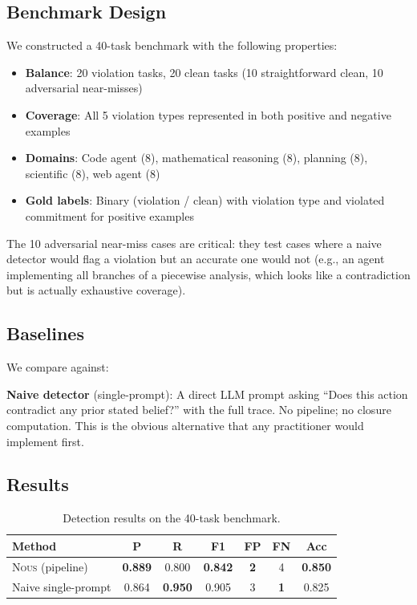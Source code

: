 \documentclass[11pt]{article}
\newcommand{\nous}{\textsc{Nous}} %
\begin{document}
\subsection{Benchmark Design}
\label{sec:benchmark}

We constructed a 40-task benchmark with the following properties:

\begin{itemize}
  \item \textbf{Balance}: 20 violation tasks, 20 clean tasks
    (10 straightforward clean, 10 adversarial near-misses)
  \item \textbf{Coverage}: All 5 violation types represented in both
    positive and negative examples
  \item \textbf{Domains}: Code agent (8), mathematical reasoning (8),
    planning (8), scientific (8), web agent (8)
  \item \textbf{Gold labels}: Binary (violation / clean) with violation type
    and violated commitment for positive examples
\end{itemize}

The 10 adversarial near-miss cases are critical: they test cases where
a naive detector would flag a violation but an accurate one would not
(e.g., an agent implementing all branches of a piecewise analysis,
which looks like a contradiction but is actually exhaustive coverage).

\subsection{Baselines}
\label{sec:baselines}

We compare against:

\textbf{Naive detector} (single-prompt): A direct LLM prompt asking
``Does this action contradict any prior stated belief?'' with the full
trace. No pipeline; no closure computation. This is the obvious
alternative that any practitioner would implement first.

\subsection{Results}
\label{sec:results}

\begin{table}[h]
\centering
\caption{Detection results on the 40-task benchmark.}
\label{tab:results}
\begin{tabular}{@{}lcccccc@{}}
\toprule
\textbf{Method} & \textbf{P} & \textbf{R} & \textbf{F1} & \textbf{FP} & \textbf{FN} & \textbf{Acc} \\
\midrule
\nous{} (pipeline) & \textbf{0.889} & 0.800 & \textbf{0.842} & \textbf{2} & 4 & \textbf{0.850} \\
Naive single-prompt & 0.864 & \textbf{0.950} & 0.905 & 3 & \textbf{1} & 0.825 \\
\bottomrule
\end{tabular}
\end{table}
\end{document}
